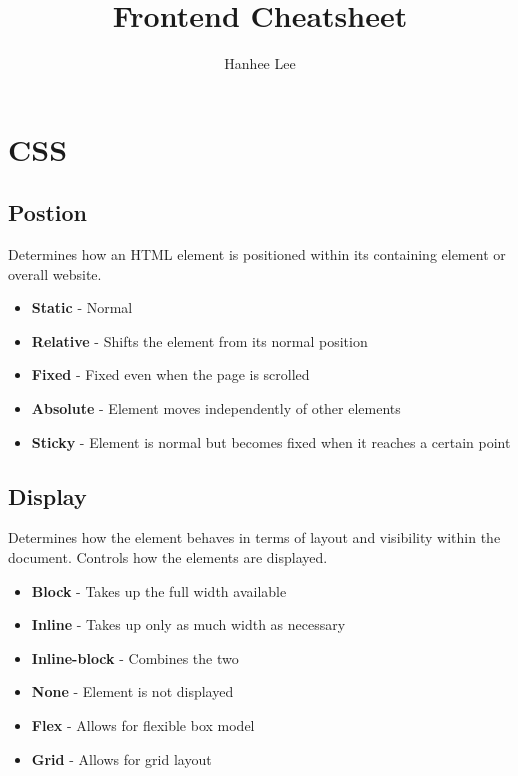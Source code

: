 \documentclass{article}
\title{Frontend Cheatsheet}
\author{Hanhee Lee}
\begin{document}
\maketitle

\tableofcontents

\listoffigures

\listoftables

\section{CSS}
\subsection{Postion}
\begin{definition}
    Determines how an HTML element is positioned within its containing element or overall website.
    \begin{itemize}
        \item \textbf{Static} - Normal
        \item \textbf{Relative} - Shifts the element from its normal position
        \item \textbf{Fixed} - Fixed even when the page is scrolled
        \item \textbf{Absolute} - Element moves independently of other elements
        \item \textbf{Sticky} - Element is normal but becomes fixed when it reaches a certain point
    \end{itemize}
\end{definition}

\subsection{Display}
\begin{definition}
    Determines how the element behaves in terms of layout and visibility within the document. Controls how the elements are displayed.
    \begin{itemize}
        \item \textbf{Block} - Takes up the full width available
        \item \textbf{Inline} - Takes up only as much width as necessary
        \item \textbf{Inline-block} - Combines the two
        \item \textbf{None} - Element is not displayed
        \item \textbf{Flex} - Allows for flexible box model
        \item \textbf{Grid} - Allows for grid layout
    \end{itemize}
\end{definition}
\end{document}
